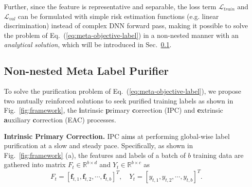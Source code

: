 \documentclass[10pt,twocolumn,letterpaper]{article}
\newcommand{\leone}[1]{\textcolor{black}{#1}}
\begin{document}
{Further, since the feature is representative and separable, the loss term $\mathcal{L}_{train}$ and $\mathcal{L}_{val}$ can be formulated with simple  risk estimation functions (e.g. linear discrimination) instead of complex DNN forward pass, making it possible to solve the problem of Eq.~(\ref{eq:meta-objective-label}) in a non-nested manner with an \emph{analytical solution}, which will be introduced in Sec.~\ref{stage2}.}\\






\vspace{-.3em}
\subsection{Non-nested Meta Label Purifier} \label{stage2}
To solve the purification problem of Eq.~(\ref{eq:meta-objective-label}), we propose two mutually reinforced solutions to seek purified training labels as shown in Fig.~\ref{fig:framework}, the \textbf{i}ntrinsic \textbf{p}rimary \textbf{c}orrection (IPC) and \textbf{e}xtrinsic \textbf{a}uxiliary \textbf{c}orrection (EAC) processes.

\textbf{Intrinsic Primary Correction.} IPC \leone{aims} at performing global-wise label purification at a slow and steady pace.
Specifically, as shown in Fig.~\ref{fig:framework} (a), {the features and labels of a batch of $b$ training data are gathered into matrix $F_t \in \mathbb{R}^{b\times d}$ and $Y_t \in \mathbb{R}^{b \times c}$ as}
\begin{equation}
    F_t = [\mathbf{f}_{t,1},\mathbf{f}_{t,2},\cdots,\mathbf{f}_{t, b}]^T, \quad Y_t = [y_{t,1},y_{t,2},\cdots,y_{t,b}]^T.
\end{equation}
\end{document}
